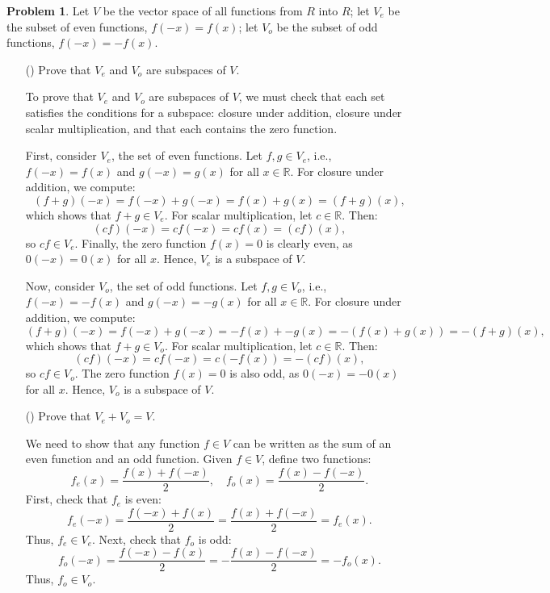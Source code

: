 \documentclass[12pt]{article}
\theoremstyle{definition}
\newtheorem{problem}{Problem}
\newcounter{subq}[problem]
\newenvironment{subproblem}
{\refstepcounter{subq} \begin{itemize} \item[(\alph{subq})]}
{\end{itemize} \medskip}
\begin{document}
\begin{problem}
    Let $V$ be the vector space of all functions from $R$ into $R$; let $V_e$ be the subset of even functions, 
    $f(-x) = f(x)$; let $V_o$ be the subset of odd functions, $f(-x) = -f(x)$.

    \begin{subproblem}
        Prove that $V_e$ and $V_o$ are subspaces of $V$.
        
        \begin{solution}
            To prove that \( V_e \) and \( V_o \) are subspaces of \( V \), we must check that each set satisfies the conditions for a subspace: closure under addition, closure under scalar multiplication, and that each contains the zero function.

            First, consider \( V_e \), the set of even functions. Let \( f, g \in V_e \), i.e., \( f(-x) = f(x) \) and \( g(-x) = g(x) \) for all \( x \in \mathbb{R} \). For closure under addition, we compute:
            \[
            (f + g)(-x) = f(-x) + g(-x) = f(x) + g(x) = (f + g)(x),
            \]
            which shows that \( f + g \in V_e \). For scalar multiplication, let \( c \in \mathbb{R} \). Then:
            \[
            (c f)(-x) = c f(-x) = c f(x) = (c f)(x),
            \]
            so \( c f \in V_e \). Finally, the zero function \( f(x) = 0 \) is clearly even, as \( 0(-x) = 0(x) \) for all \( x \). Hence, \( V_e \) is a subspace of \( V \).
    
            Now, consider \( V_o \), the set of odd functions. Let \( f, g \in V_o \), i.e., \( f(-x) = -f(x) \) and \( g(-x) = -g(x) \) for all \( x \in \mathbb{R} \). For closure under addition, we compute:
            \[
            (f + g)(-x) = f(-x) + g(-x) = -f(x) + -g(x) = -(f(x) + g(x)) = -(f + g)(x),
            \]
            which shows that \( f + g \in V_o \). For scalar multiplication, let \( c \in \mathbb{R} \). Then:
            \[
            (c f)(-x) = c f(-x) = c (-f(x)) = -(c f)(x),
            \]
            so \( c f \in V_o \). The zero function \( f(x) = 0 \) is also odd, as \( 0(-x) = -0(x) \) for all \( x \). Hence, \( V_o \) is a subspace of \( V \).
        \end{solution}
    \end{subproblem}

    \begin{subproblem}
        Prove that $V_e + V_o = V$.

        \begin{solution}
            We need to show that any function \( f \in V \) can be written as the sum of an even function and an odd function. Given \( f \in V \), define two functions:
            \[
            f_e(x) = \frac{f(x) + f(-x)}{2}, \quad f_o(x) = \frac{f(x) - f(-x)}{2}.
            \]
            First, check that \( f_e \) is even:
            \[
            f_e(-x) = \frac{f(-x) + f(x)}{2} = \frac{f(x) + f(-x)}{2} = f_e(x).
            \]
            Thus, \( f_e \in V_e \). Next, check that \( f_o \) is odd:
            \[
            f_o(-x) = \frac{f(-x) - f(x)}{2} = -\frac{f(x) - f(-x)}{2} = -f_o(x).
            \]
            Thus, \( f_o \in V_o \).


\end{solution}
\end{subproblem}
\end{problem}
\end{document}
